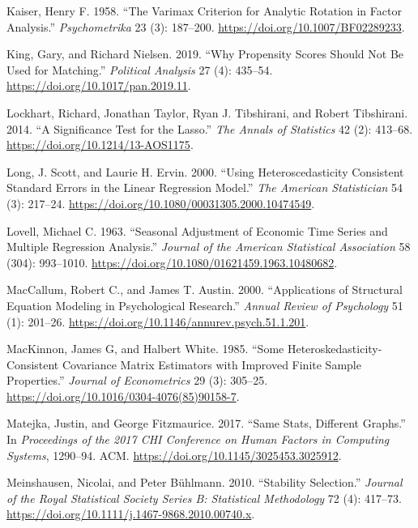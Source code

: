 \documentclass[
  letterpaper,
  10pt,
  twoside,
  openright,
  numbers=noenddot,
  chapterprefix=true]{scrbook}
\newlength{\cslhangindent}
\newenvironment{CSLReferences}[2] %
 {\begin{list}{}{%
  \setlength{\itemindent}{0pt}
  \setlength{\leftmargin}{0pt}
  \setlength{\parsep}{0pt}
  \ifodd #1
   \setlength{\leftmargin}{\cslhangindent}
   \setlength{\itemindent}{-1\cslhangindent}
  \fi
  \setlength{\itemsep}{#2\baselineskip}}}
 {\end{list}}
\begin{document}
\begin{CSLReferences}{1}{0}
Kaiser, Henry F. 1958. {``{The} {Varimax} {Criterion} for {Analytic}
{Rotation} in {Factor} {Analysis}.''} \emph{{Psychometrika}} 23 (3):
187--200. \url{https://doi.org/10.1007/BF02289233}.

King, Gary, and Richard Nielsen. 2019. {``{Why} {Propensity} {Scores}
{Should} {Not} {Be} {Used} for {Matching}.''} \emph{{Political}
{Analysis}} 27 (4): 435--54. \url{https://doi.org/10.1017/pan.2019.11}.

Lockhart, Richard, Jonathan Taylor, Ryan J. Tibshirani, and Robert
Tibshirani. 2014. {``A Significance Test for the Lasso.''} \emph{{The}
{Annals} of {Statistics}} 42 (2): 413--68.
\url{https://doi.org/10.1214/13-AOS1175}.

Long, J. Scott, and Laurie H. Ervin. 2000. {``{Using}
{Heteroscedasticity} {Consistent} {Standard} {Errors} in the {Linear}
{Regression} {Model}.''} \emph{{The} {American} {Statistician}} 54 (3):
217--24. \url{https://doi.org/10.1080/00031305.2000.10474549}.

Lovell, Michael C. 1963. {``{Seasonal} {Adjustment} of {Economic} {Time}
{Series} and {Multiple} {Regression} {Analysis}.''} \emph{{Journal} of
the {American} {Statistical} {Association}} 58 (304): 993--1010.
\url{https://doi.org/10.1080/01621459.1963.10480682}.

MacCallum, Robert C., and James T. Austin. 2000. {``{Applications} of
{Structural} {Equation} {Modeling} in {Psychological} {Research}.''}
\emph{{Annual} {Review} of {Psychology}} 51 (1): 201--26.
\url{https://doi.org/10.1146/annurev.psych.51.1.201}.

MacKinnon, James G, and Halbert White. 1985. {``{Some}
Heteroskedasticity-Consistent Covariance Matrix Estimators with Improved
Finite Sample Properties.''} \emph{{Journal} of {Econometrics}} 29 (3):
305--25. \url{https://doi.org/10.1016/0304-4076(85)90158-7}.

Matejka, Justin, and George Fitzmaurice. 2017. {``{Same} {Stats},
{Different} {Graphs}.''} In \emph{{Proceedings} of the 2017 {CHI}
{Conference} on {Human} {Factors} in {Computing} {Systems}}, 1290--94.
{ACM}. \url{https://doi.org/10.1145/3025453.3025912}.

Meinshausen, Nicolai, and Peter Bühlmann. 2010. {``{Stability}
{Selection}.''} \emph{{Journal} of the {Royal} {Statistical} {Society}
{Series} B: {Statistical} {Methodology}} 72 (4): 417--73.
\url{https://doi.org/10.1111/j.1467-9868.2010.00740.x}.


\end{CSLReferences}
\end{document}
